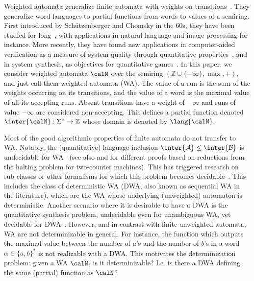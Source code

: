  Weighted automata generalize finite
automata with weights on transitions~\cite{Droste:2009:HWA:1667106}. 
They generalize word languages to partial functions from words to
values of a semiring. First introduced by Sch\"utzenberger and Chomsky in the 60s,
they have been studied for long~\cite{Droste:2009:HWA:1667106}, with
applications in natural language and image processing for
instance. More recently, they have found new applications in
computer-aided verification as a measure of system
quality through quantitative properties~\cite{cdh10}, and in
system synthesis, as objectives for quantitative games~\cite{conf/concur/FiliotGR12}. 
In this paper, we consider weighted automata $\calN$ over the semiring
$(\mathbb{Z}\cup  \{ -\infty \}, \max,+)$, and just
call them weighted automata (WA). The value of a run is the sum of the weights
occurring on its transitions, and the value of a word is the maximal value of all
its accepting runs.  Absent transitions have a weight of $-\infty$ and runs of
value $-\infty$ are considered non-accepting. This defines a partial function
denoted $\inter{\calN} : \Sigma^*\rightarrow \mathbb{Z}$ whose domain is denoted
by $\lang{\calN}$. 

 Most of the good algorithmic properties of
finite automata do not transfer to WA. Notably, the
(quantitative) language inclusion $\inter{\mathcal{A}} \leq \inter{\mathcal{B}}$ is undecidable for
WA~\cite{Krob:1992:EPR} (see also \cite{dav16} and
\cite{conf/atva/AlmagorBK11} for different proofs based on reductions
from the halting problem for two-counter machines). This has triggered 
research on sub-classes or other formalisms for which this problem becomes
decidable~\cite{DBLP:conf/fsttcs/FiliotGR14,conf/concur/ChatterjeeDEHR10}.
This includes the class of deterministic WA (DWA, also known as sequential
WA in the literature), which are the WA whose underlying (unweighted)
automaton is deterministic. Another scenario where it is desirable to
have a DWA is the quantitative synthesis problem,  
undecidable even for unambiguous WA, yet decidable for
DWA~\cite{conf/concur/FiliotGR12}. However, and in contrast with finite unweighted
automata, WA are not determinizable in general. For instance, the function
which outputs the maximal value between the number of $a$'s and the
number of $b$'s in a word $\alpha \in\{a,b\}^*$ is not realizable with a DWA. 
This motivates the determinization problem: given a WA $\calN$, is it
determinizable? I.e. is there a DWA defining the same
(partial) function as $\calN$? 

